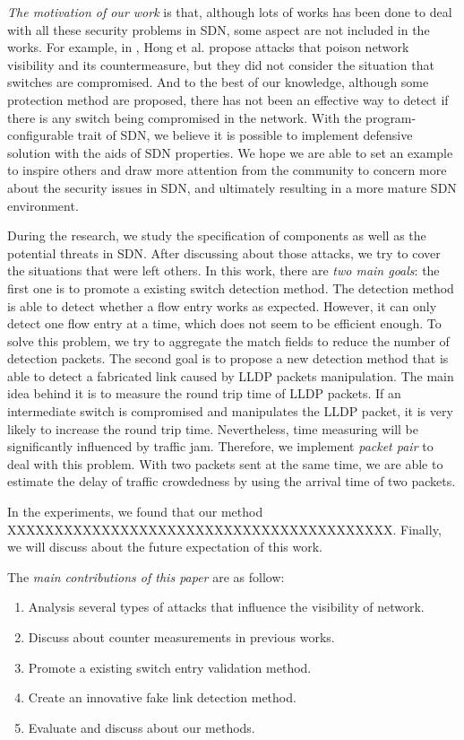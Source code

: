 \emph{The motivation of our work} is that, although lots of works has been done to deal with all these security problems in SDN, some aspect are not included in the works. For example, in \cite{HXWG15}, Hong et al. propose attacks that poison network visibility and its countermeasure, but they did not consider the situation that switches are compromised. And to the best of our knowledge, although some protection method are proposed, there has not been an effective way to detect if there is any switch being compromised in the network. With the program-configurable trait of SDN, we believe it is possible to implement defensive solution with the aids of SDN properties. We hope we are able to set an example to inspire others and draw more attention from the community to concern more about the security issues in SDN, and ultimately resulting in a more mature SDN environment.

During the research, we study the specification of components as well as the potential threats in SDN. After discussing about those attacks, we try to cover the situations that were left others. In this work, there are \emph{two main goals}: the first one is to promote a existing switch detection method. The detection method is able to detect whether a flow entry works as expected. However, it can only detect one flow entry at a time, which does not seem to be efficient enough. To solve this problem, we try to aggregate the match fields to reduce the number of detection packets. The second goal is to propose a new detection method that is able to detect a fabricated link caused by LLDP packets manipulation. The main idea behind it is to measure the round trip time of LLDP packets. If an intermediate switch is compromised and manipulates the LLDP packet, it is very likely to increase the round trip time. Nevertheless, time measuring will be significantly influenced by traffic jam. Therefore, we implement \textit{packet pair} to deal with this problem. With two packets sent at the same time, we are able to estimate the delay of traffic crowdedness by using the arrival time of two packets.

In the experiments, we found that our method XXXXXXXXXXXXXXXXXXXXXXXXXXXXXXXXXXXXXXXXX. Finally, we will discuss about the future expectation of this work.

The \emph{main contributions of this paper} are as follow:

\begin{enumerate}
\item
Analysis several types of attacks that influence the visibility of network.
\item
Discuss about counter measurements in previous works.
\item
Promote a existing switch entry validation method.
\item
Create an innovative fake link detection method.
\item
Evaluate and discuss about our methods.
\end{enumerate}

